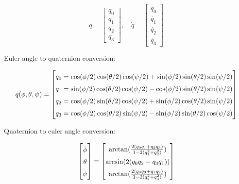 \begin{equation*}
  q =
  \begin{bmatrix}
  q_0 \\ q_1 \\ q_2 \\ q_3
  \end{bmatrix},
  \quad
  \dot{q} =
  \begin{bmatrix}
  \dot{q_0} \\ \dot{q_1} \\ \dot{q_2} \\ \dot{q_3}
  \end{bmatrix}
\end{equation*}

Euler angle to quaternion conversion:

\begin{equation*}
  q(\phi, \theta, \psi) =
  \renewcommand\arraystretch{1.5}
  \begin{bmatrix}
  q_0 = \cos(\phi/2)\cos(\theta/2)\cos(\psi/2) + \sin(\phi/2)\sin(\theta/2)\sin(\psi/2) \\
  q_1 = \sin(\phi/2)\cos(\theta/2)\cos(\psi/2) - \cos(\phi/2)\sin(\theta/2)\sin(\psi/2) \\
  q_2 = \cos(\phi/2)\sin(\theta/2)\cos(\psi/2) + \sin(\phi/2)\cos(\theta/2)\sin(\psi/2) \\
  q_3 = \cos(\phi/2)\cos(\theta/2)\sin(\psi/2) - \sin(\phi/2)\sin(\theta/2)\cos(\psi/2) \\
  \end{bmatrix}
\end{equation*}

Quaternion to euler angle conversion:

\begin{equation*}
  \begin{bmatrix}
  \phi \\ \theta \\ \psi
  \end{bmatrix}
  =
  \renewcommand\arraystretch{1.5}
  \begin{bmatrix}
  \arctan(\frac{2(q_0q_1 + q_2q_3)}{1 - 2(q_1^2 + q_2^2)}) \\
  \arcsin(2(q_0q_2 - q_3q_1)) \\
  \arctan(\frac{2(q_0q_3 + q_1q_2)}{1 - 2(q_2^2 + q_3^2)}) \\
  \end{bmatrix}
\end{equation*}

